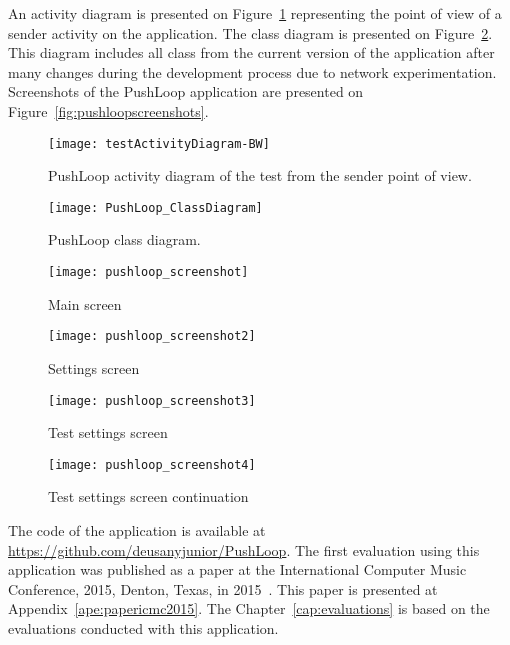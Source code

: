 An activity diagram is presented on Figure~\ref{fig:pushloopactivityDiagram} representing the point of view of a sender activity on the application.
The class diagram is presented on Figure~\ref{fig:pushloopclassdiagram}.
This diagram includes all class from the current version of the application after many changes during the development process due to network experimentation.
Screenshots of the PushLoop application are presented on Figure~\ref{fig:pushloopscreenshots}.

\begin{figure}[!ht]
	\centering
	\texttt{[image: testActivityDiagram-BW]}
	\caption{PushLoop activity diagram of the test from the sender point of view.}
	\label{fig:pushloopactivityDiagram}
\end{figure}

\begin{figure}[!ht]
	\centering
	\texttt{[image: PushLoop\_ClassDiagram]}
	\caption{PushLoop class diagram.}
	\label{fig:pushloopclassdiagram}
\end{figure}

\begin{figure*}[!ht]
	\centering
	\begin{subfigure}{.20\textwidth}
		\texttt{[image: pushloop\_screenshot]}
		\caption{Main screen}
		\label{fig:pushloopss1}
	\end{subfigure}
	\begin{subfigure}{.20\textwidth}
		\texttt{[image: pushloop\_screenshot2]}
		\caption{Settings screen}
		\label{fig:pushloopss2}
	\end{subfigure}
	\begin{subfigure}{.20\textwidth}
		\texttt{[image: pushloop\_screenshot3]}
		\caption{Test settings screen}
		\label{fig:pushloopss3}
	\end{subfigure}
	\begin{subfigure}{.20\textwidth}
		\texttt{[image: pushloop\_screenshot4]}
		\caption{Test settings screen continuation}
		\label{fig:pushloopss4}
	\end{subfigure}
	
	\caption{PushLoop application screenshots.}
	\label{fig:pushloopscreenshots}
\end{figure*}

The code of the application is available at \url{https://github.com/deusanyjunior/PushLoop}. 
The first evaluation using this application was published as a paper at the International Computer Music Conference, 2015, Denton, Texas, in 2015~\citep{deCarvalhoJunior2015computer}.
This paper is presented at Appendix~\ref{ape:papericmc2015}.
The Chapter~\ref{cap:evaluations} is based on the evaluations conducted with this application.

